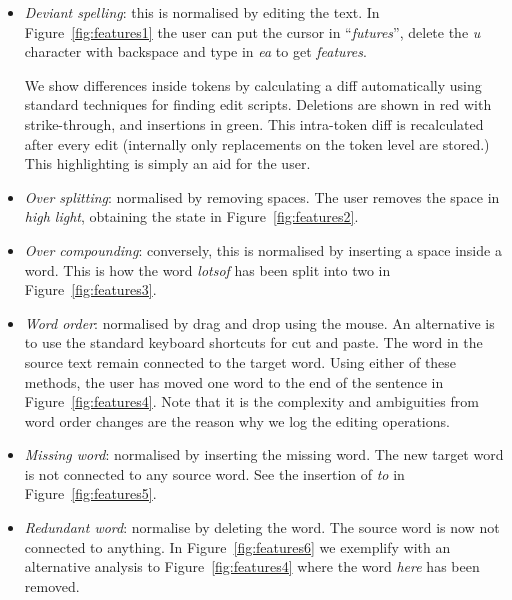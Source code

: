 \documentclass[10pt, a4paper]{article}
\begin{document}
\begin{itemize}
\item {\it Deviant spelling}: this is normalised by editing the text.
In Figure~\ref{fig:features1} the user can put the cursor in ``\emph{futures}'',
delete the \emph{u} character with backspace and type in \emph{ea} to get \emph{features}.

We show differences inside tokens by calculating a diff automatically using
standard techniques for finding edit scripts.  Deletions are shown in red
with strike-through, and insertions in green.  This intra-token diff
is recalculated after every edit (internally only replacements on the
token level are stored.)  This highlighting is simply an aid for the user.

\item {\it Over splitting}: normalised by removing spaces.
The user removes the space in \emph{high light}, obtaining the state in Figure~\ref{fig:features2}.

\item {\it Over compounding}: conversely, this is normalised by inserting a space inside a word.
This is how the word \emph{lotsof} has been split into two in Figure~\ref{fig:features3}.

\item {\it Word order}: normalised by drag and drop using the mouse.
An alternative is to use the standard keyboard shortcuts for cut and paste.
The word in the source text remain connected to the target word.
Using either of these methods, the user has moved one word to the end of the
sentence in Figure~\ref{fig:features4}. Note that it is the complexity and ambiguities from word order changes
are the reason why we log the editing operations.


\item {\it Missing word}: normalised by inserting the missing word.
The new target word is not connected to any source word.
See the insertion of \emph{to} in Figure~\ref{fig:features5}.

\item {\it Redundant word}: normalise by deleting the word.
The source word is now not connected to anything.
In Figure~\ref{fig:features6} we exemplify with
an alternative analysis to Figure~\ref{fig:features4} where the word \emph{here} has been removed.

\end{itemize}
\end{document}
